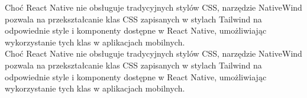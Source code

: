 Choć React Native nie obsługuje tradycyjnych stylów CSS, narzędzie NativeWind pozwala na przekształcanie klas CSS zapisanych w stylach Tailwind na odpowiednie style i komponenty dostępne w React Native, umożliwiając wykorzystanie tych klas w aplikacjach mobilnych.\\


Choć React Native nie obsługuje tradycyjnych stylów CSS, narzędzie NativeWind pozwala na przekształcanie klas CSS zapisanych w stylach Tailwind na odpowiednie style i komponenty dostępne w React Native, umożliwiając wykorzystanie tych klas w aplikacjach mobilnych.\\

